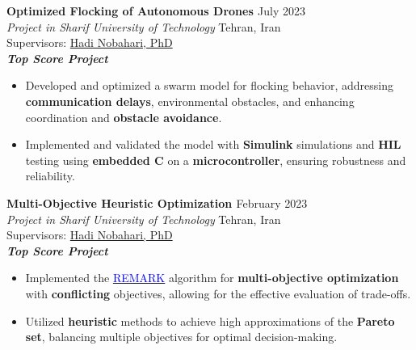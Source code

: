 \documentclass[12pt]{article}
\begin{document}
\vspace{0.2in}

\noindent
{\bfseries Optimized Flocking of Autonomous Drones
\href{https://github.com/alibaniasad1999/Guidance-and-navigation}{\faGithub}
} \hfill July 2023 \\ 
\noindent \textit{Project in Sharif University of Technology} \hfill Tehran, Iran \\ 
\noindent Supervisors: 
\href{https://ae.sharif.edu/~portal/faculty/1091235256}{Hadi Nobahari, PhD} 
\\
{\footnotesize \textbf{\textit{Top Score Project \faMedal}}}
\begin{itemize}%
    \item Developed and optimized a swarm model for flocking behavior, addressing \textbf{communication delays}, environmental obstacles, and enhancing coordination and \textbf{obstacle avoidance}.
    \item Implemented and validated the model with \textbf{Simulink} simulations and \textbf{HIL} testing using \textbf{embedded C} on a \textbf{microcontroller}, ensuring robustness and reliability.
\end{itemize}


\vspace{0.2in}
\noindent
{\bfseries Multi-Objective Heuristic Optimization
\href{https://github.com/alibaniasad1999/Heuristic-optimization-algorithms}{\faGithub}
}
\hfill February 2023 \\ 
\noindent \textit{Project in Sharif University of Technology} \hfill Tehran, Iran \\
\noindent Supervisors: 
\href{https://ae.sharif.edu/~portal/faculty/1091235256}{Hadi Nobahari, PhD}\\ 
{\footnotesize \textbf{\textit{Top Score Project \faMedal}}}
\begin{itemize} \itemsep -1pt %
    \item Implemented the \href{https://link.springer.com/article/10.1007/s12652-022-04332-8}{\textcolor{blue}{REMARK}} algorithm for \textbf{multi-objective optimization} with \textbf{conflicting} objectives, allowing for the effective evaluation of trade-offs.
    \item Utilized \textbf{heuristic} methods to achieve high approximations of the \textbf{Pareto set}, balancing multiple objectives for optimal decision-making.
\end{itemize}
\end{document}
